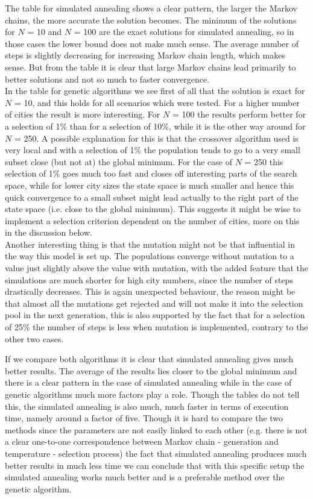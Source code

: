 \documentclass[10pt,a4paper]{article}
\begin{document}
The table for simulated annealing shows a clear pattern, the larger the Markov chains, the more accurate the solution becomes. The minimum of the solutions for $N$ = 10 and $N$ = 100 are the exact solutions for simulated annealing, so in those cases the lower bound does not make much sense. The average number of steps is slightly decreasing for increasing Markov chain length, which makes sense. But from the table it is clear that large Markov chains lead primarily to better solutions and not so much to faster convergence.\\
In the table for genetic algorithms we see first of all that the solution is exact for $N$ = 10, and this holds for all scenarios which were tested. For a higher number of cities the result is more interesting. For $N$ = 100 the results perform better for a selection of 1\% than for a selection of 10\%, while it is the other way around for $N$ = 250. A possible explanation for this is that the crossover algorithm used is very local and with a selection of 1\% the population tends to go to a very small subset close (but not at) the global minimum. For the case of $N$ = 250 this selection of 1\% goes much too fast and closes off interesting parts of the search space, while for lower city sizes the state space is much smaller and hence this quick convergence to a small subset might lead actually to the right part of the state space (i.e. close to the global minimum). This suggests it might be wise to implement a selection criterion dependent on the number of cities, more on this in the discussion below.\\
Another interesting thing is that the mutation might not be that influential in the way this model is set up. The populations converge without mutation to a value just slightly above the value with mutation, with the added feature that the simulations are much shorter for high city numbers, since the number of steps drastically decreases. This is again unexpected behaviour, the reason might be that almost all the mutations get rejected and will not make it into the selection pool in the next generation, this is also supported by the fact that for a selection of 25\% the number of steps is less when mutation is implemented, contrary to the other two cases.

If we compare both algorithms it is clear that simulated annealing gives much better results. The average of the results lies closer to the global minimum and there is a clear pattern in the case of simulated annealing while in the case of genetic algorithms much more factors play a role. Though the tables do not tell this, the simulated annealing is also much, much faster in terms of execution time, namely around a factor of five. Though it is hard to compare the two methods since the parameters are not easily linked to each other (e.g. there is not a clear one-to-one correspondence between Markov chain - generation and temperature - selection process) the fact that simulated annealing produces much better results in much less time we can conclude that with this specific setup the simulated annealing works much better and is a preferable method over the genetic algorithm. 
\end{document}
